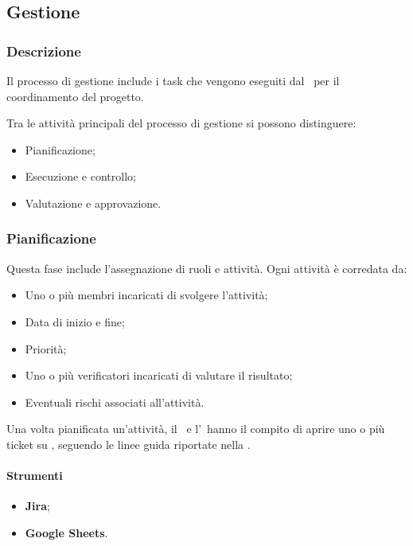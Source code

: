 \subsection{Gestione}

\subsubsection{Descrizione}
\par Il processo di gestione include i task che vengono eseguiti dal \Responsabile\ per il coordinamento del progetto.
\par Tra le attività principali del processo di gestione si possono distinguere:
\begin{itemize}
  \item Pianificazione;
  \item Esecuzione e controllo;
  \item Valutazione e approvazione.
\end{itemize}

\subsubsection{Pianificazione}
\par Questa fase include l'assegnazione di ruoli e attività. Ogni attività è corredata da:
\begin{itemize}
  \item Uno o più membri incaricati di svolgere l'attività;
  \item Data di inizio e fine;
  \item Priorità;
  \item Uno o più verificatori incaricati di valutare il risultato;
  \item Eventuali rischi associati all'attività.
\end{itemize}

\vspace{0.5\baselineskip}
\par Una volta pianificata un'attività, il \Responsabile\ e l'\Amministratore\ hanno il compito di aprire uno o più ticket su , seguendo le linee guida riportate nella .

\paragraph*{Strumenti}
\IntroStrumenti
\begin{itemize}
  \item \textbf{Jira};
  \item \textbf{Google Sheets}.
\end{itemize}

